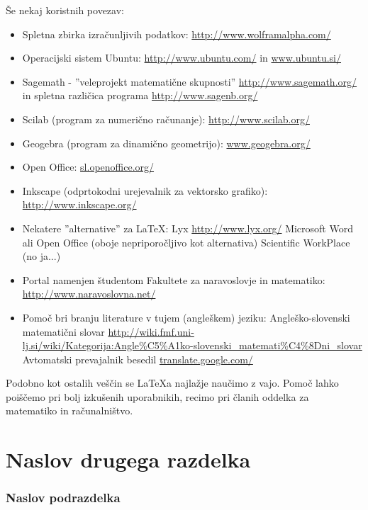 \v Se nekaj koristnih povezav:
\begin{itemize}
\item Spletna zbirka izra\v cunljivih podatkov:
  \url{http://www.wolframalpha.com/}
\item Operacijski sistem Ubuntu: \url{http://www.ubuntu.com/} in
  \url{www.ubuntu.si/}
\item Sagemath - ''veleprojekt matemati\v cne skupnosti''
  \url{http://www.sagemath.org/} in spletna razli\v cica programa
  \url{http://www.sagenb.org/}
\item Scilab (program za numeri\v cno ra\v cunanje): \url{http://www.scilab.org/}
\item Geogebra (program za dinami\v cno geometrijo): \url{www.geogebra.org/}
\item Open Office: \url{sl.openoffice.org/}
\item Inkscape (odprtokodni urejevalnik za vektorsko grafiko):\\
  \url{http://www.inkscape.org/}
\item Nekatere ''alternative'' za \LaTeX:
  \subitem Lyx \url{http://www.lyx.org/}
  \subitem Microsoft Word ali Open Office (oboje nepriporo\v cljivo
  kot alternativa)
  \subitem Scientific WorkPlace (no ja...)
\item Portal namenjen \v studentom Fakultete za naravoslovje in matematiko:\\
  \url{http://www.naravoslovna.net/}
\item Pomo\v c bri branju literature v tujem (angle\v skem) jeziku:
  \subitem Angle\v sko-slovenski matemati\v cni slovar
  \url{http://wiki.fmf.uni-lj.si/wiki/Kategorija:Angle%C5%A1ko-slovenski_matemati%C4%8Dni_slovar}
  \subitem Avtomatski prevajalnik besedil \url{translate.google.com/}
\end{itemize}

Podobno kot ostalih ve\v s\v cin se \LaTeX a najla\v zje nau\v cimo z
vajo. Pomo\v c lahko poi\v s\v cemo pri bolj izku\v senih uporabnikih,
recimo pri \v clanih oddelka za matematiko in ra\v cunalni\v stvo.



\section[Naslov drugega razdelka]{Naslov drugega razdelka}


\subsubsection{Naslov podrazdelka}

